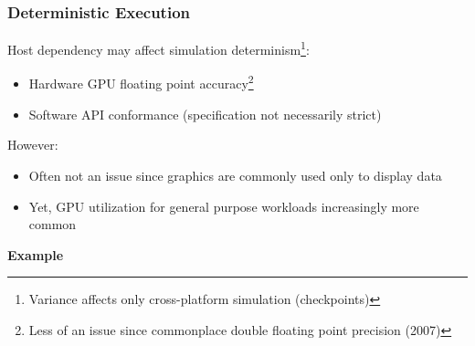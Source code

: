 
\begin{frame}

\frametitle{Deterministic Execution}

Host dependency may affect simulation determinism\footnote{Variance affects only cross-platform simulation (checkpoints)}:
\begin{itemize}
	\item Hardware GPU floating point accuracy\footnote{Less of an issue since commonplace double floating point precision (2007)}
	\item Software API conformance (specification not necessarily strict)
\end{itemize}

However:
\begin{itemize}
	\item Often not an issue since graphics are commonly used only to display data
	\item Yet, GPU utilization for general purpose workloads increasingly more common
\end{itemize}

\textbf{Example}

\end{frame}
